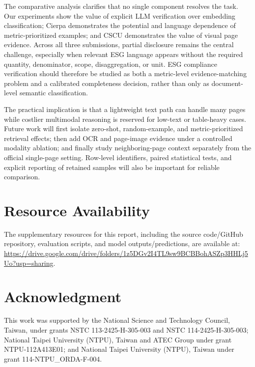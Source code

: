 \documentclass[sigconf,article]{acmart}
\begin{document}
The comparative analysis clarifies that no single component resolves the task. Our experiments show the value of explicit LLM verification over embedding classification; Cierpa demonstrates the potential and language dependence of metric-prioritized examples; and CSCU demonstrates the value of visual page evidence. Across all three submissions, partial disclosure remains the central challenge, especially when relevant ESG language appears without the required quantity, denominator, scope, disaggregation, or unit. ESG compliance verification should therefore be studied as both a metric-level evidence-matching problem and a calibrated completeness decision, rather than only as document-level semantic classification.

The practical implication is that a lightweight text path can handle many pages while costlier multimodal reasoning is reserved for low-text or table-heavy cases. Future work will first isolate zero-shot, random-example, and metric-prioritized retrieval effects; then add OCR and page-image evidence under a controlled modality ablation; and finally study neighboring-page context separately from the official single-page setting. Row-level identifiers, paired statistical tests, and explicit reporting of retained samples will also be important for reliable comparison.

\section*{Resource Availability}
The supplementary resources for this report, including the source code/GitHub repository, evaluation scripts, and model outputs/predictions, are available at:
\url{https://drive.google.com/drive/folders/1z5DGv2I4TL9sw9BCBBohASZp3HHLj5Uo?usp=sharing}.

\section*{Acknowledgment}
This work was supported by the National Science and Technology Council, Taiwan, under grants NSTC 113-2425-H-305-003 and NSTC 114-2425-H-305-003; National Taipei University (NTPU), Taiwan and ATEC Group under grant NTPU-112A413E01; and National Taipei University (NTPU), Taiwan under grant 114-NTPU\_ORDA-F-004.



\end{document}
